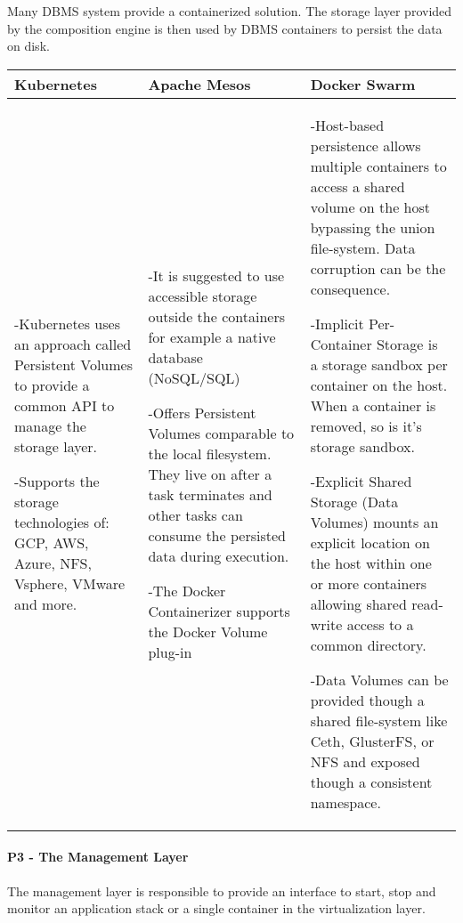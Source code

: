 Many DBMS system provide a containerized solution. The storage layer provided by
the composition engine is then used by DBMS containers to persist the data on
disk.

\begin{center}
  \begin{tabular}{ | p{4.5cm} | p{4.5cm} | p{4.5cm} | }
    \hline
    \textbf{Kubernetes}&\textbf{Apache Mesos}&\textbf{Docker Swarm}\\\hline
    -Kubernetes uses an approach called Persistent Volumes to provide a common
    API to manage the storage layer. 
    
    -Supports the storage technologies of: GCP, AWS, Azure, NFS, Vsphere,
    VMware and more.&

    -It is suggested to use accessible storage outside the containers for
    example a native database (NoSQL/SQL)
    
    -Offers Persistent Volumes comparable to the local filesystem. They
    live on after a task terminates and other tasks can consume the persisted
    data during execution.
    
    -The Docker Containerizer supports the Docker Volume plug-in & 
     
    -Host-based persistence allows multiple containers to access a shared
    volume on the host bypassing the union file-system. Data corruption can be
    the consequence.
    
    -Implicit Per-Container Storage is a storage sandbox per container on
    the host. When a container is removed, so is it's storage sandbox.
    
    -Explicit Shared Storage (Data Volumes) mounts an explicit location on the
    host within one or more containers allowing shared read-write access to
    a common directory.
    
    -Data Volumes can be provided though a shared file-system like Ceth,
    GlusterFS, or NFS and exposed though a consistent namespace.\\
    \hline
  \end{tabular}
\end{center}

\newpage
\paragraph{P3 - The Management Layer}

The management layer is responsible to provide an interface to start, stop and
monitor an application stack or a single container in the virtualization layer.

